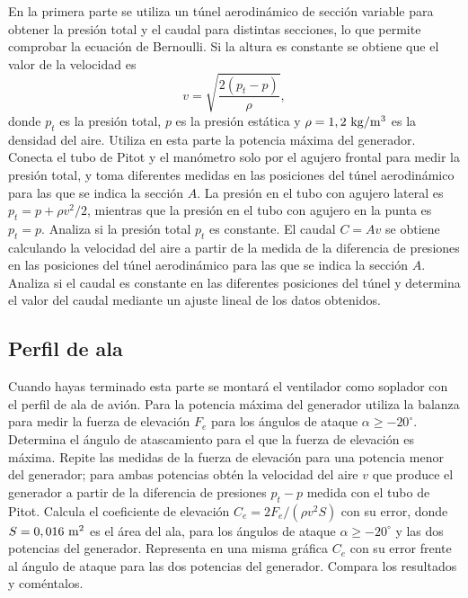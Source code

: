 \documentclass[11pt]{articulo}
\begin{document}
En la primera parte se utiliza un t\'unel aerodin\'amico de secci\'on variable para obtener la presi\'on total y el caudal para distintas secciones, lo que permite comprobar la ecuaci\'on de Bernoulli. Si la altura es constante se obtiene que el valor de la velocidad es
%
\begin{equation*}
v = \sqrt{\frac{2(p_t - p)}{\rho}},
\end{equation*}
%
donde $p_t$ es la presi\'on total,  $p$ es la presi\'on est\'atica y $\rho = 1,2~{\rm kg/m^3}$ es la densidad del aire. Utiliza en esta parte la potencia m\'axima del generador. Conecta el tubo de Pitot y el man\'ometro solo por el agujero frontal para medir la presi\'on total, y toma diferentes medidas en las posiciones del t\'unel aerodin\'amico para las que se indica la secci\'on $A$. La presi\'on en el tubo con agujero lateral es $p_t = p + \rho v^2 / 2$, mientras que la presi\'on en el tubo con agujero en la punta es $p_t = p$. Analiza si la presi\'on total $p_t$ es constante. El caudal $C = Av$ se obtiene calculando la velocidad del aire a partir de la medida de la diferencia de presiones en las posiciones del t\'unel aerodin\'amico para las que se indica la secci\'on $A$. Analiza si el caudal es constante en las diferentes posiciones del t\'unel y determina el valor del caudal mediante un ajuste lineal de los datos obtenidos.

\subsection{Perfil de ala}

Cuando hayas terminado esta parte se montar\'a el ventilador como soplador con el perfil de ala de avi\'on. Para la potencia m\'axima del generador utiliza la balanza para medir la fuerza de elevaci\'on $F_e$ para los \'angulos de ataque $\alpha \ge -20^{\circ}$. Determina el \'angulo de atascamiento para el que la fuerza de elevaci\'on es m\'axima. Repite las medidas de la fuerza de elevaci\'on para una potencia menor del generador; para ambas potencias obt\'en la velocidad del aire $v$ que produce el generador a partir de la diferencia de presiones $p_t - p$ medida con el tubo de Pitot. Calcula el coeficiente de elevaci\'on $C_e = 2 F_e / (\rho v^2 S)$ con su error, donde $S = 0,016~{\rm m^2}$ es el \'area del ala, para los \'angulos de ataque $\alpha \geq -20^{\circ}$ y las dos potencias del generador. Representa en una misma gr\'afica $C_e$ con su error frente al \'angulo de ataque para las dos potencias del generador. Compara los resultados y com\'entalos.
\end{document}
